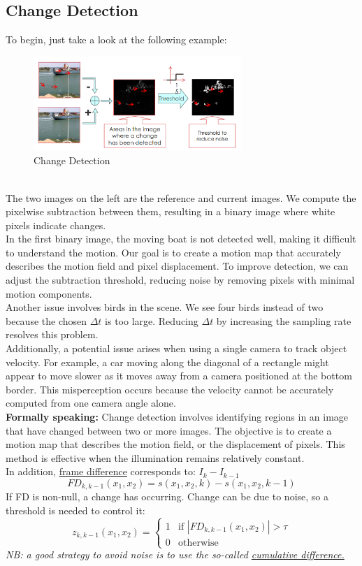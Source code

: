 \subsection{Change Detection}
To begin, just take a look at the following example:
\begin{figure}[h]
    \centering
    \includegraphics[width=0.7\textwidth]{Figures/ChangeDetection.png}
    \caption{Change Detection}
\end{figure}
\\The two images on the left are the reference and current images. 
We compute the pixelwise subtraction between them, resulting in a binary image where white pixels indicate changes.
\\
In the first binary image, the moving boat is not detected well, making it difficult to understand the motion. 
Our goal is to create a motion map that accurately describes the motion field and pixel displacement. 
To improve detection, we can adjust the subtraction threshold, reducing noise by removing pixels with minimal motion components.
\\
Another issue involves birds in the scene. We see four birds instead of two because the chosen $\Delta t$ is too large. 
Reducing $\Delta t$ by increasing the sampling rate resolves this problem.
\\
Additionally, a potential issue arises when using a single camera to track object velocity. 
For example, a car moving along the diagonal of a rectangle might appear to move slower as it moves away from a camera positioned at the bottom border. 
This misperception occurs because the velocity cannot be accurately computed from one camera angle alone.
\\
\textbf{Formally speaking:}
Change detection involves identifying regions in an image that have changed between two or more images. 
The objective is to create a motion map that describes the motion field, or the displacement of pixels. 
This method is effective when the illumination remains relatively constant.
\\In addition, \underline{frame difference} corresponds to: $I_k - I_{k-1}$
\[
    FD_{k, k-1}(x_1, x_2)= s(x_1, x_2, k)-s(x_1, x_2, k-1)
\]
If FD is non-null, a change has occurring. Change can be due to noise, so a threshold is needed to control it:
\[
    z_{k, k-1}(x_1, x_2)= \begin{cases} 1 & \text{if } |FD_{k, k-1}(x_1, x_2)| > \tau \\ 0 & \text{otherwise} \end{cases}
\]
\textit{NB: a good strategy to avoid noise is to use the so-called \underline{cumulative difference.}}
